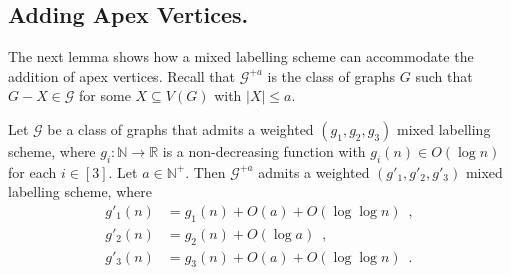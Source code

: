 \documentclass[twoside,leqno]{article}
\newcommand{\R}{\mathbb{R}}
\newcommand{\N}{\mathbb{N}}
\renewcommand{\leq}{\leqslant}
\newcommand{\Oh}{O}
\begin{document}
\subsection{Adding Apex Vertices.}
\label{sec:adding_apexes}

The next lemma shows how a mixed labelling scheme can accommodate the addition of apex vertices. Recall that $\mathcal{G}^{+a}$ is the class of graphs $G$ such that $G-X\in\mathcal{G}$ for some $X\subseteq V(G)$ with $|X|\leq a$.

\begin{lem}\label{add_apexes}
  Let $\mathcal{G}$ be a class of graphs that admits a weighted $(g_1,g_2,g_3)$ mixed labelling scheme, where $g_i:\N\to\R$ is a non-decreasing function  with $g_i(n)\in \Oh(\log n)$ for each $i\in[3]$.
  Let $a\in\N^+$. Then $\mathcal{G}^{+a}$ admits a weighted $(g'_1,g'_2,g'_3)$ mixed labelling scheme, where
  \begin{align*}
    g'_1(n)
     & = g_1(n)+\Oh(a)+\Oh(\log\log n) \enspace,  \\
    g'_2(n)
     & = g_2(n)+\Oh(\log a) \enspace,             \\
    g'_3(n)
     & = g_3(n)+\Oh(a)+\Oh(\log\log n) \enspace .
  \end{align*}
\end{lem}
\end{document}
